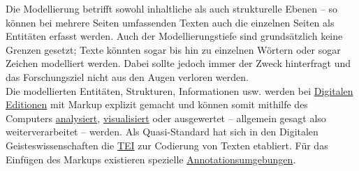\documentclass{article}
\begin{document}
        Die Modellierung betrifft sowohl inhaltliche als auch strukturelle Ebenen – so können bei mehrere Seiten umfassenden Texten auch die einzelnen Seiten als Entitäten erfasst werden. Auch der Modellierungstiefe sind grundsätzlich keine Grenzen gesetzt; Texte könnten sogar bis hin zu einzelnen Wörtern oder sogar Zeichen modelliert werden. Dabei sollte jedoch immer der Zweck hinterfragt und das Forschungsziel nicht aus den Augen verloren werden. \\
            
        Die modellierten Entitäten, Strukturen, Informationen usw. werden bei \href{http://gams.uni-graz.at/o:konde.59}{Digitalen Editionen} mit Markup explizit gemacht und können somit mithilfe des Computers \href{http://gams.uni-graz.at/o:konde.16}{analysiert}, \href{http://gams.uni-graz.at/o:konde.54}{visualisiert} oder ausgewertet – allgemein gesagt also weiterverarbeitet – werden. Als Quasi-Standard hat sich in den Digitalen Geisteswissenschaften die \href{http://gams.uni-graz.at/o:konde.178}{TEI} zur Codierung von Texten etabliert. Für das Einfügen des Markups existieren spezielle \href{http://gams.uni-graz.at/o:konde.30}{Annotationsumgebungen}.\\
            
\end{document}
